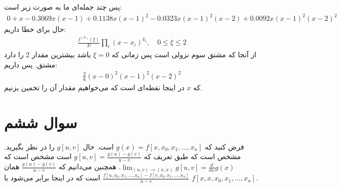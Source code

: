 \documentclass[]{article}
\begin{document}
پس چند جمله‌ای ما به صورت زیر است:
\begin{gather*}
    0 + x -0.3069 x (x-1) + 0.1138 x (x-1)^2 -0.0323 x (x-1)^2 (x-2) + 0.0092 x (x-1)^2 (x-2)^2
\end{gather*}
حال برای خطا داریم:
\begin{gather*}
    \frac{f^{(3)}(\xi)}{3!}\prod_i(x - x_i)^{k_i}, \quad 0 \le \xi \le 2
\end{gather*}
از آنجا که مشتق سوم نزولی است پس زمانی که
$\xi = 0$
باشد بیشترین مقدار 2 را دارد مشتق. پس داریم:
\begin{gather*}
    \frac{2}{6} (x - 0)^2 (x - 1)^2 (x - 2)^2 
\end{gather*}
که
$x$
در اینجا نقطه‌‌ای است که می‌خواهیم مقدار آن را تخمین بزنیم.
\section*{سوال ششم}
فرض کنید که
$g(x) = f[x, x_0, x_1, \dots, x_n]$
است. حال
$g[u, v]$
را در نظر بگیرید. مشخص است که طبق تعریف که
$g[u, v] = \frac{g(u) - g(v)}{u - v}$
است مشخص است که
$\lim_{(u, v) \rightarrow (x, x)} g[u, v] = \frac{d}{dx} g(x)$.
همچنین می‌دانیم که
$\frac{g(u) - g(v)}{u - v}$
همان
$\frac{f[u, x_0, x_1, \dots, x_n] - f[v, x_0, x_1, \dots, x_n]}{u - v}$
است که در اینجا برابر می‌شود با
$f[x, x, x_0, x_1, \dots, x_n]$.
\end{document}

